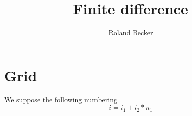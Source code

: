 \documentclass[10pt]{article}
\title{Finite difference}
\author{Roland Becker}
\begin{document}
\maketitle
%
%
\section{Grid}\label{sec:}
%
We suppose the following numbering
%
\begin{equation}\label{eq:}
i = i_1 + i_2*n_1
\end{equation}
%
%

\end{document}
